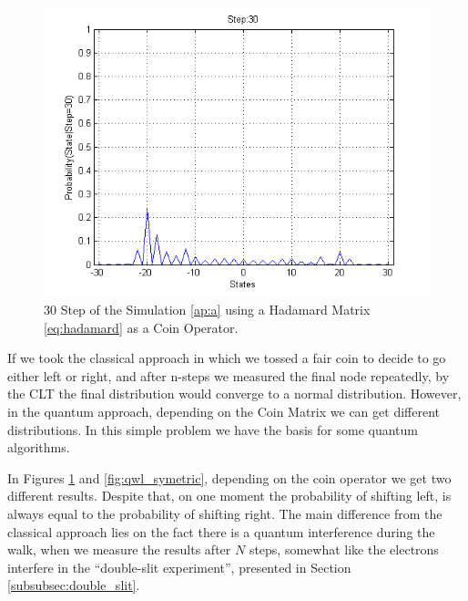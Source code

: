 \begin{figure}[h]
\centering 
\includegraphics[scale=0.50]{Figures/quantum_walk_line_hadamard.png}
\caption{30 Step of the Simulation \ref{ap:a} using a Hadamard Matrix \eqref{eq:hadamard} as a Coin Operator.}
\label{fig:qwl_hadamard}
\end{figure}

If we took the classical approach in which we tossed a fair coin to decide to go either left or right, and after n-steps we measured the final node repeatedly, by the \ac{CLT} the final distribution would converge to a normal distribution. However, in the quantum approach, depending on the Coin Matrix we can get different distributions. In this simple problem we have the basis for some quantum algorithms. 

In Figures \ref{fig:qwl_hadamard} and \ref{fig:qwl_symetric}, depending on the coin operator we get two different results. Despite that, on one moment the  probability of shifting left, is always equal to the probability of shifting right. The main difference from the classical approach  lies on the fact there is a quantum interference during the walk, when we measure the results after $N$ steps, somewhat like the electrons interfere in the ``double-slit experiment'', presented in Section \ref{subsubsec:double_slit}. 


